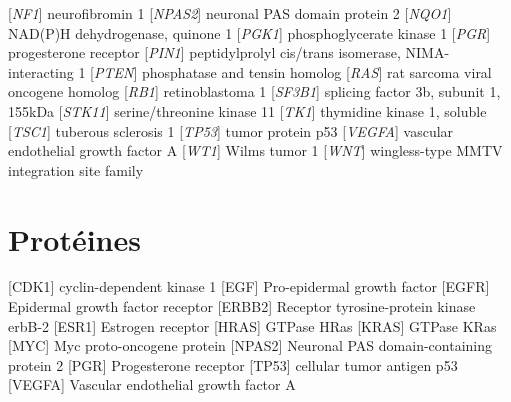 \begin{acronym}[CDKN2A]
					[\emph{NF1}]	{neurofibromin 1}
					[\emph{NPAS2}]	{neuronal PAS domain protein 2}
					[\emph{NQO1}]	{NAD(P)H dehydrogenase, quinone 1}
					[\emph{PGK1}]	{phosphoglycerate kinase 1}
					[\emph{PGR}]	{progesterone receptor}
					[\emph{PIN1}]	{peptidylprolyl cis/trans isomerase, NIMA-interacting 1}
					[\emph{PTEN}]	{phosphatase and tensin homolog}
					[\emph{RAS}]	{rat sarcoma viral oncogene homolog}
					[\emph{RB1}]	{retinoblastoma 1}
					[\emph{SF3B1}]	{splicing factor 3b, subunit 1, 155kDa}
					[\emph{STK11}]	{serine/threonine kinase 11}
					[\emph{TK1}]	{thymidine kinase 1, soluble}
					[\emph{TSC1}]	{tuberous sclerosis 1}
					[\emph{TP53}]	{tumor protein p53}
					[\emph{VEGFA}]	{vascular endothelial growth factor A}
					[\emph{WT1}]	{Wilms tumor 1}
					[\emph{WNT}]	{wingless-type MMTV integration site family}
		\end{acronym}

	\section{\textcolor{white!15!black}{Protéines}}\label{app:ac:protéines}
		\begin{acronym}[CDKN2A]
				[CDK1]	{cyclin-dependent kinase 1}
					[EGF]	{Pro-epidermal growth factor}
				[EGFR]	{Epidermal growth factor receptor}
				[ERBB2]	{Receptor tyrosine-protein kinase erbB-2}
				[ESR1]	{Estrogen receptor}
				[HRAS]	{GTPase HRas}
				[KRAS]	{GTPase KRas}
					[MYC]	{Myc proto-oncogene protein}
				[NPAS2]	{Neuronal PAS domain-containing protein 2}
					[PGR]	{Progesterone receptor}
				[TP53]	{cellular tumor antigen p53}
				[VEGFA]	{Vascular endothelial growth factor A}
		\end{acronym}

